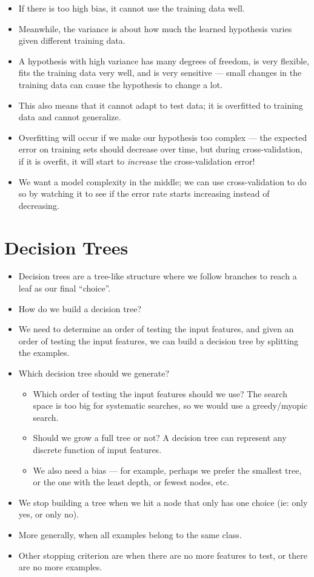\documentclass{article}
\begin{document}
\begin{itemize}
    \item If there is too high bias, it cannot use the training data well.
    \item Meanwhile, the variance is about how much the learned hypothesis varies given different training data.
    \item A hypothesis with high variance has many degrees of freedom, is very flexible, fits the training data very well, and is very sensitive --- small changes in the training data can cause the hypothesis to change a lot.
    \item This also means that it cannot adapt to test data; it is overfitted to training data and cannot generalize.
    \item Overfitting will occur if we make our hypothesis too complex --- the expected error on training sets should decrease over time, but during cross-validation, if it is overfit, it will start to \emph{increase} the cross-validation error!
    \item We want a model complexity in the middle; we can use cross-validation to do so by watching it to see if the error rate starts increasing instead of decreasing.
\end{itemize}

\section{Decision Trees}
\begin{itemize}
    \item Decision trees are a tree-like structure where we follow branches to reach a leaf as our final ``choice''.
    \item How do we build a decision tree?
    \item We need to determine an order of testing the input features, and given an order of testing the input features, we can build a decision tree by splitting the examples.
    \item Which decision tree should we generate?
        \begin{itemize}
            \item Which order of testing the input features should we use?  The search space is too big for systematic searches, so we would use a greedy/myopic search.
            \item Should we grow a full tree or not?  A decision tree can represent any discrete function of input features.
            \item We also need a bias --- for example, perhaps we prefer the smallest tree, or the one with the least depth, or fewest nodes, etc.
        \end{itemize}
    \item We stop building a tree when we hit a node that only has one choice (ie: only yes, or only no).
    \item More generally, when all examples belong to the same class.
    \item Other stopping criterion are when there are no more features to test, or there are no more examples.
\end{itemize}
\end{document}

